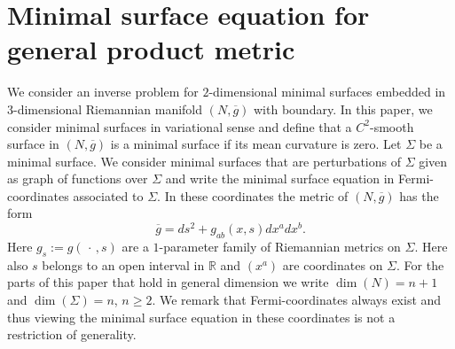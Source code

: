 \documentclass[12pt]{amsart}
\def\R{\mathbb R}
\theoremstyle{definition}
\theoremstyle{remark}
\newcommand{\ccdot}{\,\cdot\,}
\begin{document}
\begin{abstract}

\end{abstract}
\maketitle
\tableofcontents

 
\section{Minimal surface equation for general product metric}
We consider an inverse problem for $2$-dimensional minimal surfaces embedded in $3$-dimensional Riemannian manifold $(N,\overline g)$ with boundary. In this paper, we consider minimal surfaces in variational sense and define that
a $C^2$-smooth surface in  $(N,\overline g)$ is a minimal surface if its mean curvature is zero.  Let $\Sigma$ be a minimal surface. We consider minimal surfaces that are perturbations of $\Sigma$ given as graph of functions over $\Sigma$ and write the minimal surface equation in Fermi-coordinates associated to $\Sigma$. In these coordinates the metric of $(N,\overline g)$ has the form 
\begin{equation}\label{prod_metric}
 \overline g=ds^2 +g_{ab}(x,s)dx^adx^b.
\end{equation}
Here $g_s:=g(\ccdot,s)$ are a $1$-parameter family of Riemannian metrics on $\Sigma$. Here also $s$ belongs to an open interval in $\R$ and $(x^a)$ are coordinates on $\Sigma$.
For the parts of this paper that hold in general dimension we write $\dim(N)=n+1$ and $\dim(\Sigma)=n$, $n \geq 2$. We remark that Fermi-coordinates always exist and thus viewing the minimal surface equation in these coordinates is not a restriction of generality.
\end{document}
